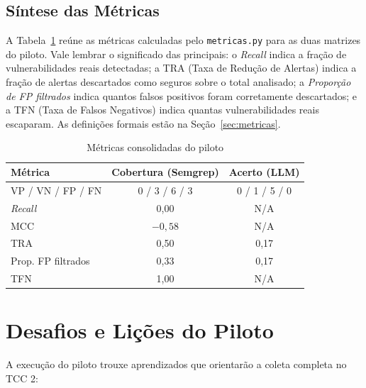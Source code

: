 \subsection{Síntese das Métricas}

A Tabela~\ref{tab:poc-metricas} reúne as métricas calculadas pelo \texttt{metricas.py} para as duas matrizes do piloto. Vale lembrar o significado das principais: o \textit{Recall} indica a fração de vulnerabilidades reais detectadas; a TRA (Taxa de Redução de Alertas) indica a fração de alertas descartados como seguros sobre o total analisado; a \textit{Proporção de FP filtrados} indica quantos falsos positivos foram corretamente descartados; e a TFN (Taxa de Falsos Negativos) indica quantas vulnerabilidades reais escaparam. As definições formais estão na Seção~\ref{sec:metricas}.

\begin{table}[htpb]
    \centering
    \caption{Métricas consolidadas do piloto}
    \label{tab:poc-metricas}
    \begin{tabular}{|l|c|c|}
        \hline
        \textbf{Métrica} & \textbf{Cobertura (Semgrep)} & \textbf{Acerto (LLM)} \\
        \hline
        VP / VN / FP / FN & 0 / 3 / 6 / 3 & 0 / 1 / 5 / 0 \\
        \hline
        \textit{Recall} & 0,00 & N/A \\
        \hline
        MCC & $-0{,}58$ & N/A \\
        \hline
        TRA & 0,50 & 0,17 \\
        \hline
        Prop. FP filtrados & 0,33 & 0,17 \\
        \hline
        TFN & 1,00 & N/A \\
        \hline
    \end{tabular}
    \fontepesquisa
\end{table}

\section{Desafios e Lições do Piloto}

A execução do piloto trouxe aprendizados que orientarão a coleta completa no TCC 2:

